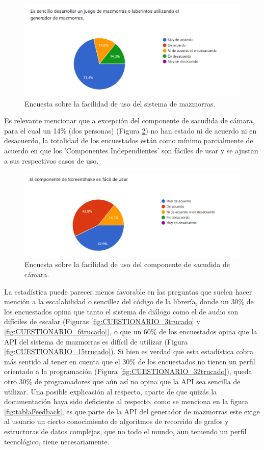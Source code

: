 \begin{figure}[H]
  \centering
  \includegraphics[width=450px,clip=true]{CUESTIONARIO_14.png}
  \caption{Encuesta sobre la facilidad de uso del sistema de mazmorras.}
  \label{fig:CUESTIONARIO_14trucado}
\end{figure}
\raggedbottom

Es relevante mencionar que a excepción del componente de sacudida de cámara, para el cual un 14\% (dos personas) (Figura \ref{fig:CUESTIONARIO_26trucado}) no han estado ni de acuerdo ni en desacuerdo, la totalidad de 
los encuestados están como mínimo parcialmente de acuerdo en que los 'Componentes Independientes' son fáciles de usar y se ajustan a sus respectivos casos de uso.

\begin{figure}[H]
  \centering
  \includegraphics[width=450px,clip=true]{CUESTIONARIO_26.png}
  \caption{Encuesta sobre la facilidad de uso del componente de sacudida de cámara.}
  \label{fig:CUESTIONARIO_26trucado}
\end{figure}
\raggedbottom

La estadística puede parecer menos favorable en las preguntas que suelen hacer mención a la escalabilidad o sencillez del código de la librería, donde un 30\% de los encuestados opina que tanto el sistema de
 diálogo como el de audio son difíciles de escalar (Figuras \ref{fig:CUESTIONARIO_3trucado} y \ref{fig:CUESTIONARIO_6trucado}), o que un 60\% de los encuestados opina que la API del sistema de mazmorras es
  difícil de utilizar (Figura \ref{fig:CUESTIONARIO_15trucado}). Si bien es verdad que esta estadística cobra más sentido al tener en cuenta que el 30\% de los encuestados no tienen un perfil orientado a
   la programación (Figura \ref{fig:CUESTIONARIO_32trucado}), queda otro 30\% de programadores que aún así no opina que la API sea sencilla de utilizar. Una posible explicación al respecto, aparte de que quizás la
   documentación haya sido deficiente al respecto, como se menciona en la figura \ref{fig:tablaFeedback}, es que parte de la API del generador de mazmorras este exige al usuario un cierto
    conocimiento de algoritmos de recorrido de grafos y estructuras de datos complejas, que no todo el mundo, aun teniendo un perfil tecnológico, tiene necesariamente. 

